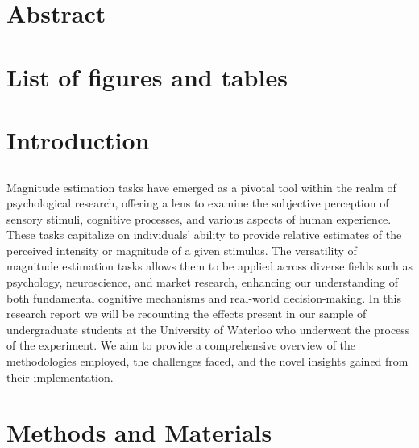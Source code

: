 \documentclass[11pt]{article}
\author{Aiden Markazi}
\date{\today}
\title{}
\begin{document}
\tableofcontents

\section{Abstract}
\label{sec:orge27f2fa}

\section{List of figures and tables}
\label{sec:org77154ed}

\section{Introduction}
\label{sec:org4dbdc22}
\subsection{}
\label{sec:org29c0c1d}
Magnitude estimation tasks have emerged as a pivotal tool within the realm of psychological research, offering a lens to examine the subjective perception of sensory stimuli, cognitive processes, and various aspects of human experience. These tasks capitalize on individuals' ability to provide relative estimates of the perceived intensity or magnitude of a given stimulus. The versatility of magnitude estimation tasks allows them to be applied across diverse fields such as psychology, neuroscience, and market research, enhancing our understanding of both fundamental cognitive mechanisms and real-world decision-making.
 In this research report we will be recounting the effects present in our sample of undergraduate students at the University of Waterloo who underwent the process of the experiment. We aim to provide a comprehensive overview of the methodologies employed, the challenges faced, and the novel insights gained from their implementation.
\section{Methods and Materials}
\label{sec:org7c9c941}
\end{document}
